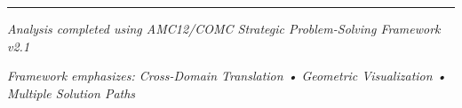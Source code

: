 \documentclass[12pt]{article}
\begin{document}
\vspace{2em}

\hrule

\vspace{1em}

\begin{center}
\textit{Analysis completed using AMC12/COMC Strategic Problem-Solving Framework v2.1}

\textit{Framework emphasizes: Cross-Domain Translation • Geometric Visualization • Multiple Solution Paths}
\end{center}
\end{document}
